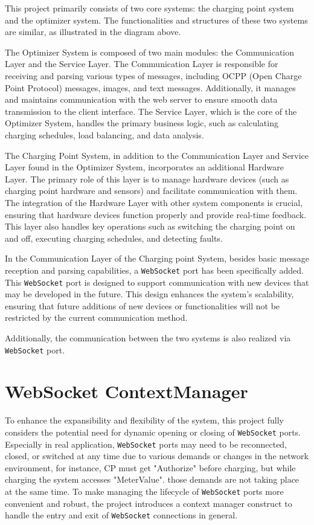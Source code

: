 \documentclass[
english,
ruledheaders=section,%
class=report,%
thesis={type=Report},%
accentcolor=9c,%
custommargins=true,%
marginpar=false,%
parskip=half-,%
fontsize=11pt,%
logofile={img/tuda_logo.pdf}, %
]{tudapub}
\begin{document}

    This project primarily consists of two core systems: the charging point system and the optimizer system. The functionalities and structures of these two systems are similar, as illustrated in the diagram above.

    The Optimizer System is composed of two main modules: the Communication Layer and the Service Layer. The Communication Layer is responsible for receiving and parsing various types of messages, including OCPP (Open Charge Point Protocol) messages, images, and text messages. Additionally, it manages and maintains communication with the web server to ensure smooth data transmission to the client interface. The Service Layer, which is the core of the Optimizer System, handles the primary business logic, such as calculating charging schedules, load balancing, and data analysis.

    The Charging Point System, in addition to the Communication Layer and Service Layer found in the Optimizer System, incorporates an additional Hardware Layer. The primary role of this layer is to manage hardware devices (such as charging point hardware and sensors) and facilitate communication with them. The integration of the Hardware Layer with other system components is crucial, ensuring that hardware devices function properly and provide real-time feedback. This layer also handles key operations such as switching the charging point on and off, executing charging schedules, and detecting faults.

    In the Communication Layer of the Charging point System, besides basic message reception and parsing capabilities, a \texttt{WebSocket} port has been specifically added. This \texttt{WebSocket} port is designed to support communication with new devices that may be developed in the future. This design enhances the system's scalability, ensuring that future additions of new devices or functionalities will not be restricted by the current communication method.

    Additionally, the communication between the two systems is also realized via \texttt{WebSocket} port.


    \section{WebSocket ContextManager}
    \label{sec:websocketContextManager}

    To enhance the expansibility and flexibility of the system, this project fully considers the potential need for dynamic opening or closing of \texttt{WebSocket} ports. Especially in real application, \texttt{WebSocket} ports may need to be reconnected, closed, or switched at any time due to various demands or changes in the network environment, for instance, CP must get "Authorize" before charging, but while charging the system accesses "MeterValue". those demands are not taking place at the same time. To make managing the lifecycle of \texttt{WebSocket} ports more convenient and robust, the project introduces a context manager construct to handle the entry and exit of \texttt{WebSocket} connections in general.
\end{document}
